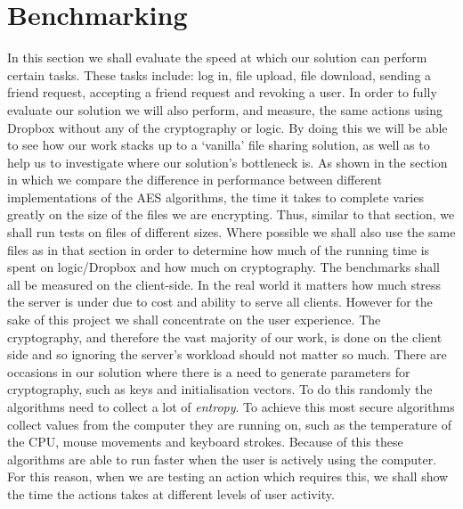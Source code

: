 \documentclass[12pt, titlepage]{article}
\begin{document}
\section{Benchmarking}
In this section we shall evaluate the speed at which our solution can perform certain tasks. These tasks include: log in, file upload, file download, sending a friend request, accepting a friend request and revoking a user. In order to fully evaluate our solution we will also perform, and measure, the same actions using Dropbox without any of the cryptography or logic. By doing this we will be able to see how our work stacks up to a `vanilla' file sharing solution, as well as to help us to investigate where our solution's bottleneck is.
\newline \indent As shown in the section in which we compare the difference in performance between different implementations of the AES algorithms, the time it takes to complete varies greatly on the size of the files we are encrypting. Thus, similar to that section, we shall run tests on files of different sizes. Where possible we shall also use the same files as in that section in order to determine how much of the running time is spent on logic/Dropbox and how much on cryptography.
\newline \indent The benchmarks shall all be measured on the client-side. In the real world it matters how much stress the server is under due to cost and ability to serve all clients. However for the sake of this project we shall concentrate on the user experience. The cryptography, and therefore the vast majority of our work, is done on the client side and so ignoring the server's workload should not matter so much.
\newline \indent There are occasions in our solution where there is a need to generate parameters for cryptography, such as keys and initialisation vectors. To do this randomly the algorithms need to collect a lot of \textit{entropy}. To achieve this most secure algorithms collect values from the computer they are running on, such as the temperature of the CPU, mouse movements and keyboard strokes. Because of this these algorithms are able to run faster when the user is actively using the computer. For this reason, when we are testing an action which requires this, we shall show the time the actions takes at different levels of user activity.
\end{document}

